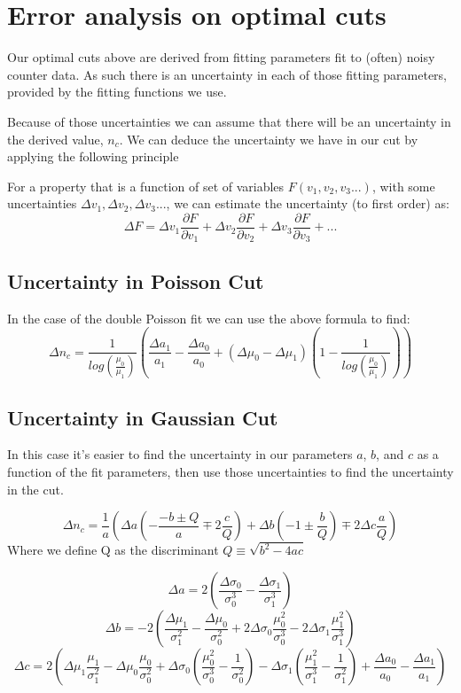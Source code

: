 \documentclass{article}
\begin{document}
\section{Error analysis on optimal cuts}
Our optimal cuts above are derived from fitting parameters fit to (often) noisy counter data. As such there is an uncertainty in each of those fitting parameters, provided by the fitting functions we use.

Because of those uncertainties we can assume that there will be an uncertainty in the derived value, $n_c$. We can deduce the uncertainty we have in our cut by applying the following principle

For a property that is a function of set of variables $F(v_1,v_2,v_3...)$, with some uncertainties $\Delta v_1, \Delta v_2, \Delta v_3 ...$, we can estimate the uncertainty (to first order) as:
\[ \Delta F = \Delta v_1 \frac{\partial F}{\partial v_1} + \Delta v_2 \frac{\partial F}{\partial v_2} + \Delta v_3 \frac{\partial F}{\partial v_3} + ...\]

\subsection{Uncertainty in Poisson Cut}

In the case of the double Poisson fit we can use the above formula to find:
\[ \Delta n_c = \frac{1}{log\left(\frac{\mu_0}{\mu_1}\right)} \left(\frac{\Delta a_1}{a_1} - \frac{\Delta a_0}{a_0} + (\Delta\mu_0-\Delta\mu_1)\left(1-\frac{1}{log\left(\frac{\mu_0}{\mu_1}\right)}\right)\right)\]

\subsection{Uncertainty in Gaussian Cut}

In this case it's easier to find the uncertainty in our parameters $a$, $b$, and $c$ as a function of the fit parameters, then use those uncertainties to find the uncertainty in the cut.

\[\Delta n_c = \frac{1}{a}\left(\Delta a \left(-\frac{-b\pm Q}{a}\mp 2\frac{c}{Q}\right) +\Delta b \left(-1\pm \frac{b}{Q}\right) \mp 2\Delta c \frac{a}{Q}\right)\]
Where we define Q as the discriminant
$Q \equiv \sqrt{b^2-4ac}$

\[\Delta a = 2\left(\frac{\Delta\sigma_0}{\sigma_0^3}-\frac{\Delta\sigma_1}{\sigma_1^3}\right)\]
\[\Delta b = -2\left(\frac{\Delta\mu_1}{\sigma_1^2}-\frac{\Delta\mu_0}{\sigma_0^2}+2\Delta \sigma_0\frac{\mu_0^2}{\sigma_0^3}-2\Delta \sigma_1\frac{\mu_1^2}{\sigma_1^3}\right)\]
\[ \Delta c = 2\left(\Delta \mu_1 \frac{\mu_1}{\sigma_1^2}-\Delta \mu_0 \frac{\mu_0}{\sigma_0^2}+\Delta \sigma_0\left(\frac{\mu_0^2}{\sigma_0^3}-\frac{1}{\sigma_0^2} \right) - \Delta \sigma_1\left(\frac{\mu_1^2}{\sigma_1^3}-\frac{1}{\sigma_1^2} \right) + \frac{\Delta a_0}{a_0}- \frac{\Delta a_1}{a_1}\right)\]
\end{document}
